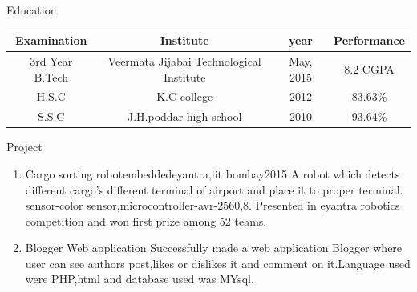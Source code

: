 \documentclass{resume} %
\begin{document}
\begin{rSection}{Education}
	\begin{center}
		\begin{tabular}{||c|c|c|c||}
			\hline\hline
			\bf Examination & \bf Institute & \bf year & \bf Performance \\
			\hline\hline 
			3rd Year B.Tech & Veermata Jijabai Technological Institute & May, 2015 & 8.2 CGPA \\
			\hline
			H.S.C & K.C college & 2012 & 83.63\% \\
			\hline
			S.S.C & J.H.poddar high school & 2010 & 93.64\% \\
			\hline\hline
			
			
		\end{tabular}
	\end{center}
	
\end{rSection}
\begin{rSection}{Project}
	
	\begin{enumerate}
		\item \begin{rSubsection}{Cargo sorting robot}{embedded}{eyantra,iit bombay}{2015}
			 A robot which detects different cargo's different terminal of airport and place it to proper terminal.
			sensor-color sensor,microcontroller-avr-2560,8.
			Presented in eyantra robotics competition and won first prize among 52  teams.
		\end{rSubsection}
		
		\item \begin{rSubsection}{Blogger Web application} 
			{}{}{} 
		 Successfully made a web application Blogger where user can see authors post,likes or dislikes it and comment on it.Language used were PHP,html and database used was MYsql.   
		\end{rSubsection} 
	\end{enumerate}
\end{rSection}
\end{document}
